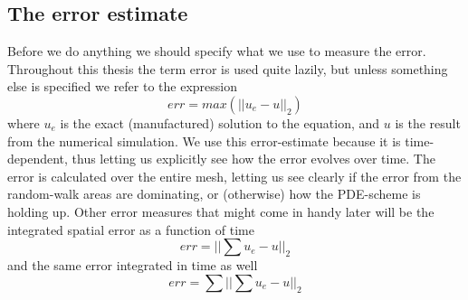 \subsection{The error estimate}
Before we do anything we should specify what we use to measure the error. 
Throughout this thesis the term error is used quite lazily, but unless something else is specified we refer to the expression 
\begin{equation}
 err = max\left(||u_e-u||_2\right)
\end{equation}
where $u_e$ is the exact (manufactured) solution to the equation, and $u$ is the result from the numerical simulation. 
We use this error-estimate because it is time-dependent, thus letting us explicitly see how the error evolves over time. 
The error is calculated over the entire mesh, letting us see clearly if the error from the random-walk areas are dominating, or (otherwise) how the PDE-scheme is holding up.
Other error measures that might come in handy later will be the integrated spatial error as a function of time
\begin{equation}
 err = ||\sum u_e-u||_2
\end{equation}
and the same error integrated in time as well
\begin{equation}
 err = \sum||\sum u_e-u||_2
\end{equation}

